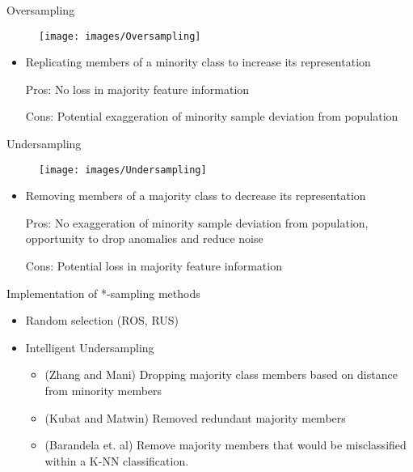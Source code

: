 \documentclass[xcolor={dvipsnames}]{beamer}
\begin{document}
\begin{frame}{Oversampling}
	\begin{figure}
		\centering
		\texttt{[image: images/Oversampling]}
	\end{figure}
	\begin{itemize}
		\item Replicating members of a minority class to increase its representation
		\item[Pros:] No loss in majority feature information
		\item[Cons:] Potential exaggeration of minority sample deviation from population
	\end{itemize}
\end{frame}
\begin{frame}{Undersampling}
	\begin{figure}
		\centering
		\texttt{[image: images/Undersampling]}
	\end{figure}
	\begin{itemize}
		\item Removing members of a majority class to decrease its representation
		\item[Pros:] No exaggeration of minority sample deviation from population, opportunity to drop anomalies and reduce noise
		\item[Cons:] Potential loss in majority feature information
	\end{itemize}
\end{frame}
\begin{frame}{Implementation of *-sampling methods}
	\begin{itemize}
		\item Random selection (ROS, RUS)
		\item Intelligent Undersampling
		\begin{itemize}
			\item (Zhang and Mani) Dropping majority class members based on distance from minority members
			\item (Kubat and Matwin) Removed redundant majority members
			\item (Barandela et. al) Remove majority members that would be misclassified within a K-NN classification.
		\end{itemize}
	\end{itemize}
\end{frame}
\end{document}
